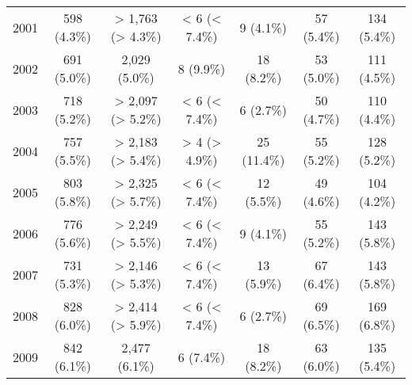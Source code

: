 \documentclass{article}
\begin{document}
\begin{table}[htbp]
\begin{tabular}{l*{6}{c}}
  2001                                                  &           598 (4.3\%)           &        > 1,763 (> 4.3\%)        &          < 6 (< 7.4\%)          &            9 (4.1\%)            &            57 (5.4\%)           &           134 (5.4\%)           \\
  2002                                                  &           691 (5.0\%)           &          2,029 (5.0\%)          &            8 (9.9\%)            &            18 (8.2\%)           &            53 (5.0\%)           &           111 (4.5\%)           \\
  2003                                                  &           718 (5.2\%)           &        > 2,097 (> 5.2\%)        &          < 6 (< 7.4\%)          &            6 (2.7\%)            &            50 (4.7\%)           &           110 (4.4\%)           \\
  2004                                                  &           757 (5.5\%)           &        > 2,183 (> 5.4\%)        &          > 4 (> 4.9\%)          &           25 (11.4\%)           &            55 (5.2\%)           &           128 (5.2\%)           \\
  2005                                                  &           803 (5.8\%)           &        > 2,325 (> 5.7\%)        &          < 6 (< 7.4\%)          &            12 (5.5\%)           &            49 (4.6\%)           &           104 (4.2\%)           \\
  2006                                                  &           776 (5.6\%)           &        > 2,249 (> 5.5\%)        &          < 6 (< 7.4\%)          &            9 (4.1\%)            &            55 (5.2\%)           &           143 (5.8\%)           \\
  2007                                                  &           731 (5.3\%)           &        > 2,146 (> 5.3\%)        &          < 6 (< 7.4\%)          &            13 (5.9\%)           &            67 (6.4\%)           &           143 (5.8\%)           \\
  2008                                                  &           828 (6.0\%)           &        > 2,414 (> 5.9\%)        &          < 6 (< 7.4\%)          &            6 (2.7\%)            &            69 (6.5\%)           &           169 (6.8\%)           \\
  2009                                                  &           842 (6.1\%)           &          2,477 (6.1\%)          &            6 (7.4\%)            &            18 (8.2\%)           &            63 (6.0\%)           &           135 (5.4\%)           \\

\end{tabular}
\end{table}
\end{document}

